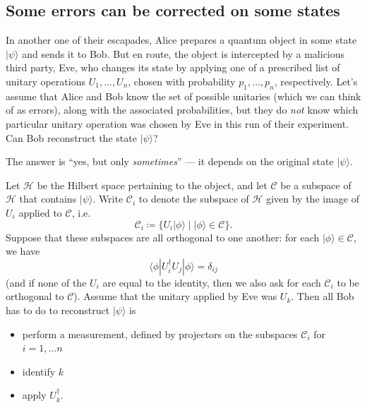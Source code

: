 \documentclass[fleqn,a4paper]{article}
\providecommand{\tightlist}{\setlength{\itemsep}{0pt}\setlength{\parskip}{0pt}}
\theoremstyle{definition}
\theoremstyle{definition}
\theoremstyle{definition}
\theoremstyle{definition}
\theoremstyle{remark}
\begin{document}
\hypertarget{some-errors-can-be-corrected-on-some-states}{%
\subsection{Some errors can be corrected on some states}\label{some-errors-can-be-corrected-on-some-states}}

In another one of their escapades, Alice prepares a quantum object in some state \(|\psi\rangle\) and sends it to Bob.
But en route, the object is intercepted by a malicious third party, Eve, who changes its state by applying one of a prescribed list of unitary operations \(U_1,\ldots,U_n\), chosen with probability \(p_1,\ldots,p_n\), respectively.
Let's assume that Alice and Bob know the set of possible unitaries (which we can think of as errors), along with the associated probabilities, but they do \emph{not} know which particular unitary operation was chosen by Eve in this run of their experiment.
Can Bob reconstruct the state \(|\psi\rangle\)?

The answer is ``yes, but only \emph{sometimes}'' --- it depends on the original state \(|\psi\rangle\).

Let \(\mathcal{H}\) be the Hilbert space pertaining to the object, and let \(\mathcal{C}\) be a subspace of \(\mathcal{H}\) that contains \(|\psi\rangle\).
Write \(\mathcal{C}_i\) to denote the subspace of \(\mathcal{H}\) given by the image of \(U_i\) applied to \(\mathcal{C}\), i.e.
\[
  \mathcal{C}_i \coloneqq \{U_i|\phi\rangle \mid |\phi\rangle\in\mathcal{C}\}.
\]
Suppose that these subspaces are all orthogonal to one another: for each \(|\phi\rangle\in\mathcal{C}\), we have
\[
  \langle\phi|U^\dagger_i U_j|\phi\rangle = \delta_{ij}
\]
(and if none of the \(U_i\) are equal to the identity, then we also ask for each \(\mathcal{C}_i\) to be orthogonal to \(\mathcal{C}\)).
Assume that the unitary applied by Eve was \(U_k\).
Then all Bob has to do to reconstruct \(|\psi\rangle\) is

\begin{itemize}
\tightlist
\item
  perform a measurement, defined by projectors on the subspaces \(\mathcal{C}_i\) for \(i=1,\ldots n\)
\item
  identify \(k\)
\item
  apply \(U_k^\dagger\).
\end{itemize}
\end{document}
